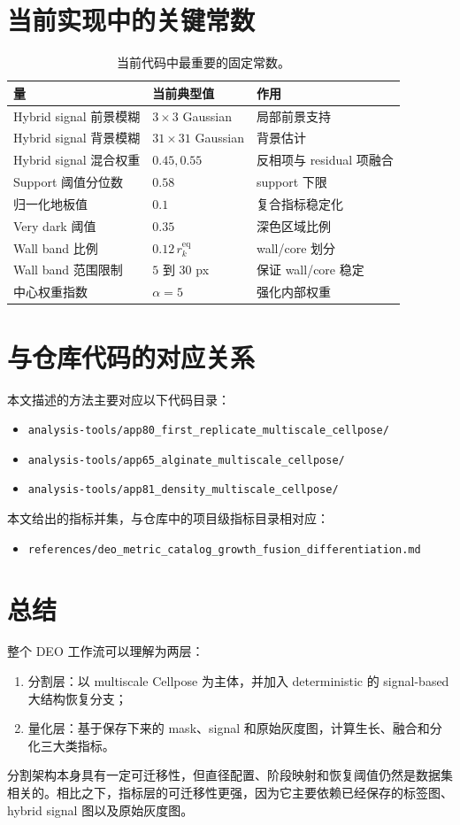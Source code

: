\documentclass[11pt]{article}
\newcommand{\1}{\mathbf{1}}
\begin{document}
\section{当前实现中的关键常数}
\begin{table}[H]
\centering
\small
\begin{tabular}{@{}lll@{}}
\toprule
量 & 当前典型值 & 作用 \\
\midrule
Hybrid signal 前景模糊 & $3\times3$ Gaussian & 局部前景支持 \\
Hybrid signal 背景模糊 & $31\times31$ Gaussian & 背景估计 \\
Hybrid signal 混合权重 & $0.45, 0.55$ & 反相项与 residual 项融合 \\
Support 阈值分位数 & $0.58$ & support 下限 \\
归一化地板值 & $0.1$ & 复合指标稳定化 \\
Very dark 阈值 & $0.35$ & 深色区域比例 \\
Wall band 比例 & $0.12\,r_k^{\mathrm{eq}}$ & wall/core 划分 \\
Wall band 范围限制 & $5$ 到 $30$ px & 保证 wall/core 稳定 \\
中心权重指数 & $\alpha=5$ & 强化内部权重 \\
\bottomrule
\end{tabular}
\caption{当前代码中最重要的固定常数。}
\end{table}

\section{与仓库代码的对应关系}
本文描述的方法主要对应以下代码目录：
\begin{itemize}[leftmargin=1.5em]
  \item \texttt{analysis-tools/app80\_first\_replicate\_multiscale\_cellpose/}
  \item \texttt{analysis-tools/app65\_alginate\_multiscale\_cellpose/}
  \item \texttt{analysis-tools/app81\_density\_multiscale\_cellpose/}
\end{itemize}

本文给出的指标并集，与仓库中的项目级指标目录相对应：
\begin{itemize}[leftmargin=1.5em]
  \item \texttt{references/deo\_metric\_catalog\_growth\_fusion\_differentiation.md}
\end{itemize}

\section{总结}
整个 DEO 工作流可以理解为两层：
\begin{enumerate}[leftmargin=1.8em]
  \item 分割层：以 multiscale Cellpose 为主体，并加入 deterministic 的 signal-based 大结构恢复分支；
  \item 量化层：基于保存下来的 mask、signal 和原始灰度图，计算生长、融合和分化三大类指标。
\end{enumerate}

分割架构本身具有一定可迁移性，但直径配置、阶段映射和恢复阈值仍然是数据集相关的。相比之下，指标层的可迁移性更强，因为它主要依赖已经保存的标签图、hybrid signal 图以及原始灰度图。
\end{document}
